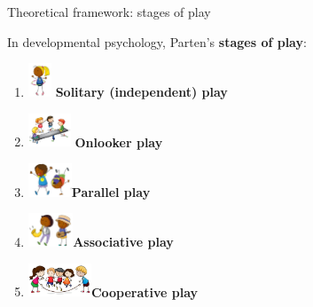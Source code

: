 \documentclass[xcolor=table]{beamer}
\begin{document}



{
\begin{frame}[label=parten]{Theoretical framework: stages of play}

    In developmental psychology, Parten's {\bf stages of play}:

    \begin{enumerate}
        \item \includegraphics[height=1cm]{figs/stagesofplay/solitary} {\bf Solitary (independent) play}
        \item \includegraphics[height=1cm]{figs/stagesofplay/onlooker} {\bf Onlooker play}
        \item \includegraphics[height=1cm]{figs/stagesofplay/parallel}{\bf Parallel play}
        \item \includegraphics[height=1cm]{figs/stagesofplay/associative}{\bf Associative play}
        \item \includegraphics[height=1cm]{figs/stagesofplay/cooperative}{\bf Cooperative play}
    \end{enumerate}


\end{frame}}
\end{document}
